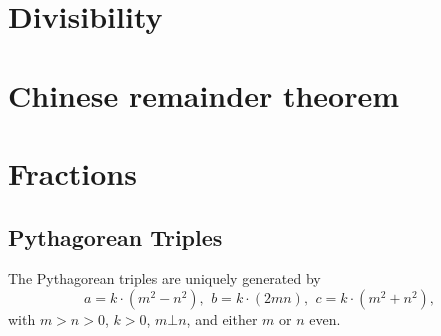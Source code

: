 \section{Divisibility}

\section{Chinese remainder theorem}

\section{Fractions}




\subsection{Pythagorean Triples}
 The Pythagorean triples are uniquely generated by
 \[ a=k\cdot (m^{2}-n^{2}),\ \,b=k\cdot (2mn),\ \,c=k\cdot (m^{2}+n^{2}), \]
 with $m > n > 0$, $k > 0$, $m \bot n$, and either $m$ or $n$ even.






